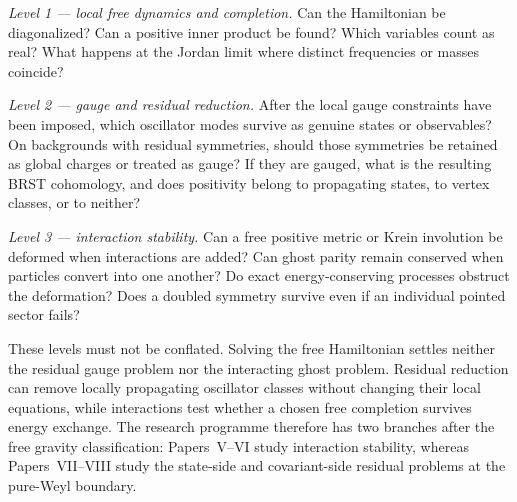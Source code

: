 \documentclass[11pt]{article}
\theoremstyle{remark}
\begin{document}
\emph{Level 1 --- local free dynamics and completion.}  Can the Hamiltonian
be diagonalized?  Can a positive inner product be found?  Which variables
count as real?  What happens at the Jordan limit where distinct frequencies
or masses coincide?

\emph{Level 2 --- gauge and residual reduction.}  After the local gauge
constraints have been imposed, which oscillator modes survive as genuine
states or observables?  On backgrounds with residual symmetries, should
those symmetries be retained as global charges or treated as gauge?  If they
are gauged, what is the resulting BRST cohomology, and does positivity
belong to propagating states, to vertex classes, or to neither?

\emph{Level 3 --- interaction stability.}  Can a free positive metric or
Krein involution be deformed when interactions are added?  Can ghost parity
remain conserved when particles convert into one another?  Do exact
energy-conserving processes obstruct the deformation?  Does a doubled
symmetry survive even if an individual pointed sector fails?

These levels must not be conflated.  Solving the free Hamiltonian settles
neither the residual gauge problem nor the interacting ghost problem.
Residual reduction can remove locally propagating oscillator classes
without changing their local equations, while interactions test whether a
chosen free completion survives energy exchange.  The research programme
therefore has two branches after the free gravity classification:
Papers~V--VI study interaction stability, whereas Papers~VII--VIII study
the state-side and covariant-side residual problems at the pure-Weyl
boundary.
\end{document}
